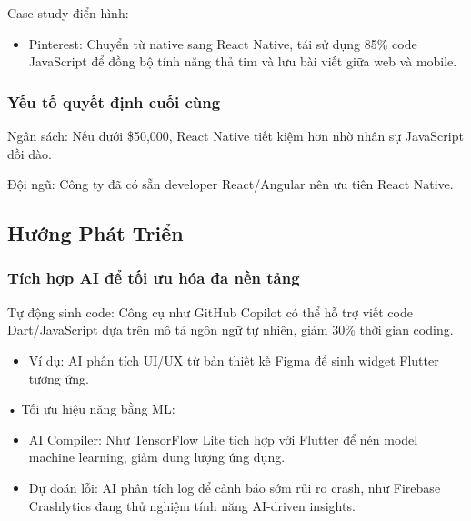     \begin{flushleft}
      \hspace*{0.8cm}Case study điển hình:
      \setlength{\leftmargini}{1.5cm}
      \begin{itemize}
          \item Pinterest: Chuyển từ native sang React Native, tái sử dụng 85\% code JavaScript để đồng bộ tính năng thả tim và lưu bài viết giữa web và mobile.
      \end{itemize}
    \end{flushleft}

    \subsubsection{Yếu tố quyết định cuối cùng}
    \begin{flushleft}
      \hspace*{0.8cm}Ngân sách: Nếu dưới \$50,000, React Native tiết kiệm hơn nhờ nhân sự JavaScript dồi dào.
    \end{flushleft}

    \begin{flushleft}
      \hspace*{0.8cm}Đội ngũ: Công ty đã có sẵn developer React/Angular nên ưu tiên React Native.
    \end{flushleft}

\subsection{Hướng Phát Triển}
\renewcommand{\labelitemi}{--}    
\subsubsection{Tích hợp AI để tối ưu hóa đa nền tảng}
\begin{flushleft}
  \hspace*{0.8cm}Tự động sinh code: Công cụ như GitHub Copilot có thể hỗ trợ viết code Dart/JavaScript dựa trên mô tả ngôn ngữ tự nhiên, giảm 30\% thời gian coding.
  \setlength{\leftmargini}{1.5cm}
  \begin{itemize}
    \item Ví dụ: AI phân tích UI/UX từ bản thiết kế Figma để sinh widget Flutter tương ứng.
  \end{itemize}
\end{flushleft}

\begin{flushleft}
  \hspace*{0.8cm}•	Tối ưu hiệu năng bằng ML:
  \setlength{\leftmargini}{1.5cm}
  \begin{itemize}
      \item AI Compiler: Như TensorFlow Lite tích hợp với Flutter để nén model machine learning, giảm dung lượng ứng dụng.
      \item Dự đoán lỗi: AI phân tích log để cảnh báo sớm rủi ro crash, như Firebase Crashlytics đang thử nghiệm tính năng AI-driven insights.
  \end{itemize}
\end{flushleft}

